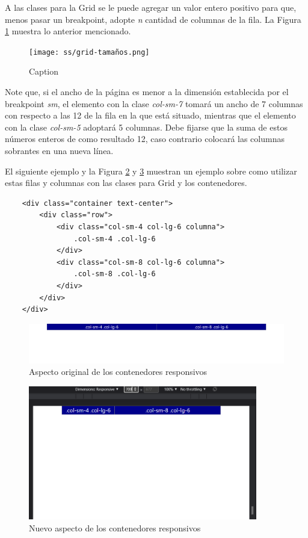 A las clases para la Grid se le puede agregar un valor entero positivo para que, menos pasar un breakpoint, adopte \textit{n} cantidad de columnas de la fila. La Figura \ref{fig:16} muestra lo anterior mencionado.
\begin{figure}[H]
    \centering
    \caption{Caption}
    \label{fig:16}
    \texttt{[image: ss/grid-tamaños.png]}
\end{figure}

Note que, si el ancho de la página es menor a la dimensión establecida por el breakpoint \textit{sm}, el elemento con la clase \textit{col-sm-7} tomará un ancho de 7 columnas con respecto a las 12 de la fila en la que está situado, mientras que el elemento con la clase \textit{col-sm-5} adoptará 5 columnas. Debe fijarse que la suma de estos números enteros de como resultado 12, caso contrario colocará las columnas sobrantes en una nueva línea.

El siguiente ejemplo y la Figura \ref{fig:17} y \ref{fig:18} muestran un ejemplo sobre como utilizar estas filas y columnas con las clases para Grid y los contenedores.
\begin{lstlisting}
    <div class="container text-center">
        <div class="row">
            <div class="col-sm-4 col-lg-6 columna">
                .col-sm-4 .col-lg-6
            </div>
            <div class="col-sm-8 col-lg-6 columna">
                .col-sm-8 .col-lg-6
            </div>
        </div>
    </div>
\end{lstlisting}
\begin{figure}[H]
    \centering
    \caption{Aspecto original de los contenedores responsivos}
    \label{fig:17}
    \includegraphics[width=\textwidth]{ss/row-cols1.png}
\end{figure}
\begin{figure}[H]
    \centering
    \caption{Nuevo aspecto de los contenedores responsivos}
    \label{fig:18}
    \includegraphics[width=10cm]{ss/row-cols2.png}
\end{figure}


